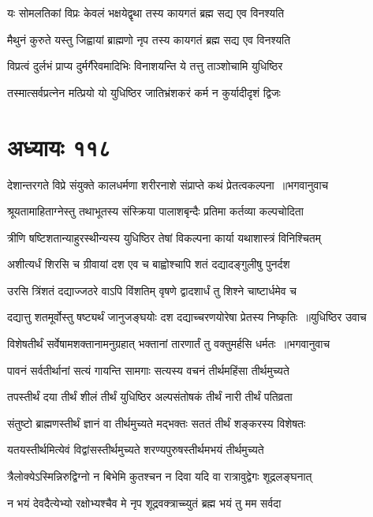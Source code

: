 \twolineshloka
{यः सोमलतिकां विप्रः केवलं भक्षयेद्वृथा}
{तस्य कायगतं ब्रह्म सद्य एव विनश्यति}


\twolineshloka
{मैथुनं कुरुते यस्तु जिह्वायां ब्राह्मणो नृप}
{तस्य कायगतं ब्रह्म सद्य एव विनश्यति}


\twolineshloka
{विप्रत्वं दुर्लभं प्राप्य दुर्मर्गैरेवमादिभिः}
{विनाशयन्ति ये तत्तु ताञ्शोचामि युधिष्ठिर}


\twolineshloka
{तस्मात्सर्वप्रत्नेन मत्प्रियो यो युधिष्ठिर}
{जातिभ्रंशकरं कर्म न कुर्यादीदृशं द्विजः}


\chapter{अध्यायः ११८}
\threelineshloka
{देशान्तरगते विप्रे संयुक्ते कालधर्मणा}
{शरीरनाशे संप्राप्ते कथं प्रेतत्वकल्पना ॥भगवानुवाच}
{}


\twolineshloka
{श्रूयतामाहिताग्नेस्तु तथाभूतस्य संस्क्रिया}
{पालाशबृन्दैः प्रतिमा कर्तव्या कल्पचोदिता}


\twolineshloka
{त्रीणि षष्टिशतान्याहुरस्थीन्यस्य युधिष्ठिर}
{तेषां विकल्पना कार्या यथाशास्त्रं विनिश्चितम्}


\twolineshloka
{अशीत्यर्धं शिरसि च ग्रीवायां दश एव च}
{बाह्वोश्चापि शतं दद्यादङ्गुलीषु पुनर्दश}


\twolineshloka
{उरसि त्रिंशतं दद्याज्जठरे वाऽपि विंशतिम्}
{वृषणे द्वादशार्धं तु शिश्ने चाष्टार्धमेव च}


\threelineshloka
{दद्यात्तु शतमूर्वोस्तु षष्ट्यर्थं जानुजङ्घयोः}
{दश दद्याच्चरणयोरेषा प्रेतस्य निष्कृतिः ॥युधिष्ठिर उवाच}
{}


\threelineshloka
{विशेषतीर्थं सर्वेषामशक्तानामनुग्रहात्}
{भक्तानां तारणार्तं तु वक्तुमर्हसि धर्मतः ॥भगवानुवाच}
{}


\twolineshloka
{पावनं सर्वतीर्थानां सत्यं गायन्ति सामगाः}
{सत्यस्य वचनं तीर्थमहिंसा तीर्थमुच्यते}


\twolineshloka
{तपस्तीर्थं दया तीर्थं शीलं तीर्थं युधिष्ठिर}
{अल्पसंतोषकं तीर्थं नारी तीर्थं पतिव्रता}


\twolineshloka
{संतुष्टो ब्राह्मणस्तीर्थं ज्ञानं वा तीर्थमुच्यते}
{मद्भक्तः सततं तीर्थं शङ्करस्य विशेषतः}


\twolineshloka
{यतयस्तीर्थमित्येवं विद्वांसस्तीर्थमुच्यते}
{शरण्यपुरुषस्तीर्थमभयं तीर्थमुच्यते}


\twolineshloka
{त्रैलोक्येऽस्मिन्निरुद्विग्नो न बिभेमि कुतश्चन}
{न दिवा यदि वा रात्रावुद्वेगः शूद्रलङ्घनात्}


\twolineshloka
{न भयं देवदैत्येभ्यो रक्षोभ्यश्चैव मे नृप}
{शूद्रवक्त्राच्च्युतं ब्रह्म भयं तु मम सर्वदा}


